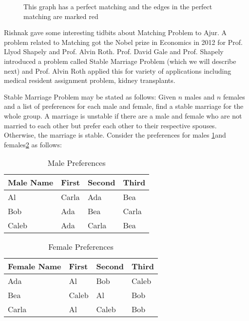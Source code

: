 \begin{figure}
\begin{center}
\caption{ This graph has a perfect matching and the edges in the perfect matching are marked red}\label{16g2}
\end{center}
\end{figure}
Rishnak gave some interesting tidbits about Matching Problem to Ajur.
A problem related to Matching got the Nobel prize in Economics in 2012 for Prof. Llyod Shapely and 
Prof. Alvin Roth.  Prof. David Gale and Prof. Shapely introduced a problem called Stable Marriage Problem (which we will describe next) and Prof. Alvin Roth applied this for variety of applications including medical resident assignment problem, kidney transplants. 

Stable Marriage Problem may be stated as follows:
Given $n$ males and $n$ females and a list of preferences for each male and female, find a stable marriage for the whole group.
A marriage is unstable if there are a male and female who are not married to each other but prefer each other to their respective spouses. Otherwise, the marriage is stable.
Consider the preferences for males \ref{16t1}and females\ref{16t2} as follows:
\begin{table}
\begin{center}
\begin{tabular}{ |p{3cm}||p{1.5cm}||p{1.5cm} || p{1.5cm}|| }
 \hline
 \hline
 Male Name & First&Second&Third\\
 \hline
 Al  & Carla    &Ada&Bea\\
Bob&Ada&Bea&Carla\\
Caleb&Ada&Carla&Bea\\
 
 
 \hline
\end{tabular}
\caption{Male Preferences}\label{16t1}
\end{center}
\end{table}
\begin{table}
\begin{center}
\begin{tabular}{ |p{3cm}||p{1.5cm}||p{1.5cm} || p{1.5cm}|| }
 \hline
 \hline
 Female Name & First&Second&Third\\
 \hline
 Ada  & Al    &Bob&Caleb\\
Bea&Caleb&Al&Bob\\
Carla&Al&Caleb&Bob\\
 
 
 \hline
\end{tabular}
\caption{Female Preferences}\label{16t2}
\end{center}
\end{table}


